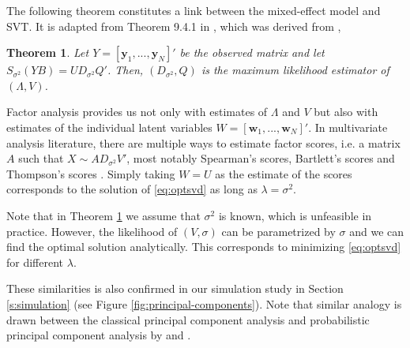 \documentclass[preprint]{imsart}
\numberwithin{equation}{section}
\theoremstyle{plain}
\newtheorem{theorem}{Theorem}
\newcommand{\tr}[1]{{\textcolor{red}{#1}}}
\newcommand{\by}{\mathbf{y}}
\newcommand{\bw}{\mathbf{w}}
\begin{document}
The following theorem constitutes a link between the mixed-effect model and SVT. It is adapted from Theorem 9.4.1 in \citet{mardia1980multivariate}, which was derived from \citet{joreskog1967some}, 

\begin{theorem}\label{thm:maxlike}
  Let $Y = [\by_1,...,\by_N]'$ be the observed matrix and let $S_{\sigma^2}(YB) = UD_{\sigma^2}Q'$. Then, $(D_{\sigma^2},Q)$ is the maximum likelihood estimator of $(\Lambda,V)$.
\end{theorem}

Factor analysis provides us not only with estimates of $\Lambda$ and $V$ but also with estimates of the individual latent variables $W = [\bw_1,...,\bw_N]'$.
In multivariate analysis literature, there are multiple ways to estimate factor scores, i.e. a matrix $A$ such that $X \sim AD_{\sigma^2}V'$, most notably Spearman's scores, Bartlett's scores and Thompson's scores \citep{kim1978factor}. %
Simply taking $W = U$ as the estimate of the scores corresponds to the solution of \eqref{eq:optsvd} as long as $\lambda = \sigma^2$.

Note that in Theorem \ref{thm:maxlike} we assume that $\sigma^2$ is known, which is unfeasible in practice. However, the likelihood of $(V,\sigma)$ can be parametrized by $\sigma$ and we can find the optimal solution analytically. This corresponds to minimizing \eqref{eq:optsvd} for different $\lambda$.


These similarities is also confirmed in our simulation study in Section \ref{s:simulation} (see Figure \ref{fig:principal-components}). Note that similar analogy is drawn between the classical principal component analysis and probabilistic principal component analysis by \citet{tipping1999probabilistic} and \citet{james2000principal}. 

\end{document}
